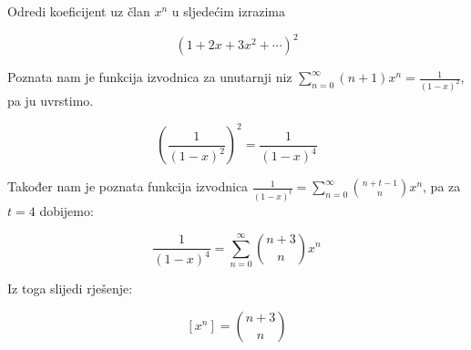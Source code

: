 \documentclass{article}
\begin{document}
	Odredi koeficijent uz član \( x^n \) u sljedećim izrazima
	
	\[ (1 + 2x + 3x^2 + \cdots)^2 \]
	
	Poznata nam je funkcija izvodnica za unutarnji niz \( \sum\limits^\infty_{n=0} (n + 1) x^n = \frac{1}{(1 - x)^2} \), pa ju uvrstimo.
	
	\[ \left ( \frac{1}{(1 - x)^2} \right )^2 = \frac{1}{(1 - x)^4} \]
	
	Također nam je poznata funkcija izvodnica \( \frac{1}{(1 - x)^t} = \sum\limits^\infty_{n=0} \binom{n + t - 1}{n} x^n \), pa za \( t = 4 \) dobijemo: 
	
	\[ \frac{1}{(1 - x)^4} = \sum\limits^\infty_{n=0} \binom{n + 3}{n} x^n \]
	
	Iz toga slijedi rješenje:
	
	\[ [x^n] = \binom{n + 3}{n} \]
\end{document}
